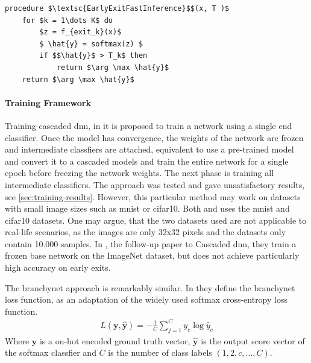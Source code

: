 \begin{minipage}{\linewidth}
	\begin{lstlisting}[language = {}, mathescape=true, caption={Early Exit using Score-margin }, label={lst:score-margin-inference}]
procedure $\textsc{EarlyExitFastInference}$$(x, T )$
	for $k = 1\dots K$ do
		$z = f_{exit_k}(x)$
		$ \hat{y} = softmax(z) $
		if $$\hat{y}$ > T_k$ then
			return $\arg \max \hat{y}$
	return $\arg \max \hat{y}$ 
	\end{lstlisting}
\end{minipage}

\paragraph{Training Framework} 
Training cascaded \gls{dnn}, in \cite{leroux_resource-constrained_2015} it is proposed to train a network using a single end classifier. Once the model has convergence, the weights of the network are frozen and intermediate classfiers are attached, equivalent to use a pre-trained model and convert it to a cascaded models and train the entire network for a single epoch before freezing the network weights. The next phase is training all intermediate classifiers. The approach was tested and gave unsatisfactory results, see \ref{sec:training-results}. However, this particular method may work on datasets with small image sizes such as \gls{mnist} or \gls{cifar10}. Both \cite{leroux_resource-constrained_2015} and \cite{teerapittayanon_branchynet:_2016} uses the \gls{mnist} and \gls{cifar10} datasets. One may argue, that the two datasets used are not applicable to real-life scenarios, as the images are only 32x32 pixels and the datasets only contain 10.000 samples. In \cite{leroux_cascading_2017}, the follow-up paper to Cascaded \gls{dnn}, they train a frozen base network on the ImageNet dataset, but does not achieve particularly high accuracy on early exits.  

The \gls{branchynet} approach is remarkably similar. In \cite{teerapittayanon_branchynet:_2016} they define the \gls{branchynet} loss function, as an adaptation of the widely used softmax cross-entropy loss function.
\begin{align}
L\left(\mathbf{y},\hat{\mathbf{y}}\right) = - \frac{1}{C} \sum_{j =1}^{C} y_c \log \hat{y}_c
\end{align}
Where $ \bm{y} $ is a on-hot encoded ground truth vector, $ \bm{\hat{y}} $ is the output score vector of the softmax classfier and $ C $ is the number of class labels $ (1, 2, c, \dots, C) $.
	
